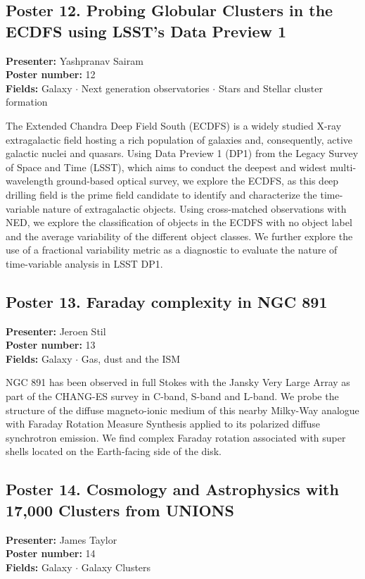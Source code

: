 \hypertarget{poster-abstract-talk-139}{}\label{poster-abstract-page-talk-139}
\subsection*{Poster 12. Probing Globular Clusters in the ECDFS using LSST's Data Preview 1}
\textbf{Presenter:} Yashpranav Sairam\\
\textbf{Poster number:} 12\\
\textbf{Fields:} Galaxy $\cdot$ Next generation observatories $\cdot$ Stars and Stellar cluster formation

The Extended Chandra Deep Field South (ECDFS) is a widely studied X-ray extragalactic field hosting a rich population of galaxies and, consequently, active galactic nuclei and quasars. Using Data Preview 1 (DP1) from the Legacy Survey of Space and Time (LSST), which aims to conduct the deepest and widest multi-wavelength ground-based optical survey, we explore the ECDFS, as this deep drilling field is the prime field candidate to identify and characterize the time-variable nature of extragalactic objects. Using cross-matched observations with NED, we explore the classification of objects in the ECDFS with no object label and the average variability of the different object classes. We further explore the use of a fractional variability metric as a diagnostic to evaluate the nature of time-variable analysis in LSST DP1.

\hypertarget{poster-abstract-talk-116}{}\label{poster-abstract-page-talk-116}
\subsection*{Poster 13. Faraday complexity in NGC 891}
\textbf{Presenter:} Jeroen Stil\\
\textbf{Poster number:} 13\\
\textbf{Fields:} Galaxy $\cdot$ Gas, dust and the ISM

NGC 891 has been observed in full Stokes with the Jansky Very Large Array as part of the CHANG-ES survey in C-band, S-band and L-band. We probe the structure of the diffuse magneto-ionic medium of this nearby Milky-Way analogue with Faraday Rotation Measure Synthesis applied to its polarized diffuse synchrotron emission. We find complex Faraday rotation associated with super shells located on the Earth-facing side of the disk.

\hypertarget{poster-abstract-talk-250}{}\label{poster-abstract-page-talk-250}
\subsection*{Poster 14. Cosmology and Astrophysics with 17,000 Clusters from UNIONS}
\textbf{Presenter:} James Taylor\\
\textbf{Poster number:} 14\\
\textbf{Fields:} Galaxy $\cdot$ Galaxy Clusters

